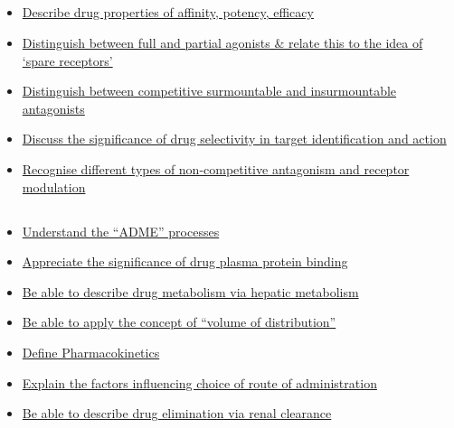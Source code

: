 \documentclass[10pt, a4paper]{article}
\newcommand{\MYhref}[3][blue]{\href{#2}{\color{#1}{#3}}}%
\begin{document}
\subsection{\MYhref[melbBlue]{https://notion.so/c1087b8e8a1547739c3a564daefc4f3d}{Pharmacodynamics}} \begin{itemize} \item \href{https://www.notion.so/83b91a543d4a491bb919b6ba67149834}{Describe drug properties of affinity, potency, efficacy } \item \href{https://www.notion.so/8484eb7d2333475584df9b47d0c4b1ff}{Distinguish between full and partial agonists \& relate this to the idea of ‘spare receptors’} \item \href{https://www.notion.so/8210e9c8e5fa4180839a888dc00c3be6}{Distinguish between competitive surmountable and insurmountable antagonists} \item \href{https://www.notion.so/a8c0afb80ec04aa3af324fa825511cc0}{Discuss the significance of drug selectivity in target identification and action} \item \href{https://www.notion.so/196a4461aba34f4b986c337adf9f6a8b}{Recognise different types of non-competitive antagonism and receptor modulation} \end{itemize}
\subsection{\MYhref[melbBlue]{https://notion.so/d5b8f12869dc4530951b91d45e543355}{Introduction to Pharmacokinetics}} \begin{itemize} \item \href{https://www.notion.so/9cdfd1ff1bcf46e685c1cb614c6ef41f}{Understand the “ADME” processes} \item \href{https://www.notion.so/2f28fc9236cd4d9991dcea2b59ad1d6f}{Appreciate the significance of drug plasma protein binding} \item \href{https://www.notion.so/c2e9e015f44b4b789abd38f33cffd360}{Be able to describe drug metabolism via hepatic metabolism} \item \href{https://www.notion.so/cab216a9c08e413d971160b7c077676f}{Be able to apply the concept of “volume of distribution”} \item \href{https://www.notion.so/f0c8c636ae19450d9f2c5ece542f0e09}{Define Pharmacokinetics} \item \href{https://www.notion.so/b6d722518b5042b5a206dd3dd475d708}{Explain the factors influencing choice of route of administration} \item \href{https://www.notion.so/158194975fd449d3a287b92c8b2ba278}{Be able to describe drug elimination via renal clearance} \end{itemize}
\end{document}
